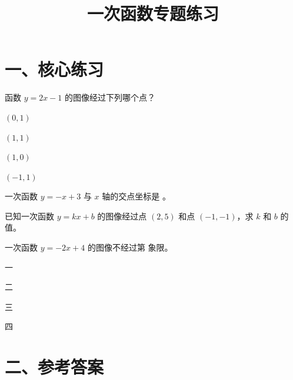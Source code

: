 \documentclass{exam-zh}
\newcommand{\answerarea}[1][40mm]{%
  \vspace{3mm}%
  \begin{tcolorbox}[
    enhanced, breakable,
    colback=white,
    colframe=black!25,
    boxrule=0.8pt,
    arc=0pt,
    height=#1,
    valign=top,
  ]
  \end{tcolorbox}%
}
\begin{document}
\title{一次函数专题练习}
\subject{%
  图像与解析式 · 八年级 · 数学}
\maketitle

\section*{一、核心练习}


\begin{question}[points=4]
  函数 $y=2x-1$ 的图像经过下列哪个点？
  \begin{choices}
    \item $(0,1)$
    \item $(1,1)$
    \item $(1,0)$
    \item $(-1,1)$
  \end{choices}
\end{question}




\begin{question}[points=4]
  一次函数 $y=-x+3$ 与 $x$ 轴的交点坐标是 \underline{\hspace{2cm}}。
  \fillin
\end{question}




\begin{problem}[points=8]
  已知一次函数 $y=kx+b$ 的图像经过点 $(2,5)$ 和点 $(-1,-1)$，求 $k$ 和 $b$ 的值。
  \answerarea[45mm]
\end{problem}




\begin{question}[points=4]
  一次函数 $y=-2x+4$ 的图像不经过第 \underline{\hspace{1cm}} 象限。
  \begin{choices}
    \item 一
    \item 二
    \item 三
    \item 四
  \end{choices}
\end{question}



\clearpage
\section*{二、参考答案}
\end{document}
